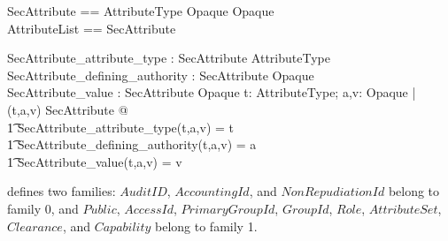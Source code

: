  
\begin{zed}
  SecAttribute == AttributeType \cross Opaque \cross Opaque \\
  AttributeList == \seq SecAttribute
\end{zed}
\begin{axdef}
  SecAttribute\_attribute\_type : SecAttribute \fun AttributeType\\
  SecAttribute\_defining\_authority : SecAttribute \fun Opaque\\
  SecAttribute\_value : SecAttribute \fun Opaque
  \where
  \forall t: AttributeType; a,v: Opaque | (t,a,v) \in SecAttribute @ \\
  \t1 SecAttribute\_attribute\_type(t,a,v) = t \\
  \t1 \land SecAttribute\_defining\_authority(t,a,v) = a \\
  \t1 \land SecAttribute\_value(t,a,v) = v
\end{axdef}
\corbasec{} defines two families: $AuditID$, $AccountingId$, and
$NonRepudiationId$ belong to family 0, and $Public$, $AccessId$,
$PrimaryGroupId$, $GroupId$, $Role$, $AttributeSet$, $Clearance$, and
$Capability$ belong to family 1.


